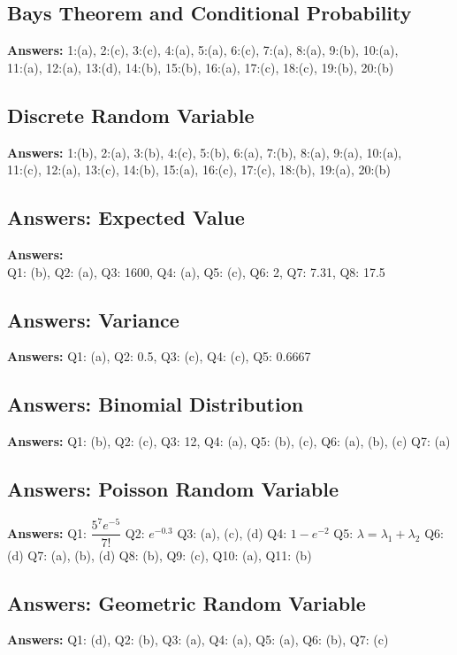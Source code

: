 \subsection*{Bays Theorem and Conditional Probability}
\noindent \textbf{Answers: } 1:(a), 2:(c), 3:(c), 4:(a), 5:(a), 6:(c), 7:(a), 8:(a), 9:(b), 10:(a),\\
11:(a), 12:(a), 13:(d), 14:(b), 15:(b), 16:(a), 17:(c), 18:(c), 19:(b), 20:(b)

\subsection*{Discrete Random Variable}
\noindent \textbf{Answers: } 1:(b), 2:(a), 3:(b), 4:(c), 5:(b), 6:(a), 7:(b), 8:(a), 9:(a), 10:(a),\\
11:(c), 12:(a), 13:(c), 14:(b), 15:(a), 16:(c), 17:(c), 18:(b), 19:(a), 20:(b)

\subsection*{Answers: Expected Value}
\noindent\textbf{Answers:}\\
Q1: (b), Q2: (a), Q3: 1600, Q4: (a), Q5: (c), Q6: 2, Q7: 7.31, Q8: 17.5

\subsection*{Answers: Variance}
\noindent\textbf{Answers:} Q1: (a), Q2: 0.5, Q3: (c), Q4: (c), Q5: 0.6667

\subsection*{Answers: Binomial Distribution}
\noindent\textbf{Answers:} Q1: (b), Q2: (c), Q3: 12, Q4: (a), Q5: (b), (c), Q6: (a), (b), (c) \quad Q7: (a)

\subsection*{Answers: Poisson Random Variable}
\noindent\textbf{Answers:}  
Q1: $\dfrac{5^7 e^{-5}}{7!}$  
Q2: $e^{-0.3}$  
Q3: (a), (c), (d)  
Q4: $1 - e^{-2}$  
Q5: $\lambda = \lambda_1 + \lambda_2$
Q6: (d)  
Q7: (a), (b), (d)
Q8: (b),  
Q9: (c),  
Q10: (a),  
Q11: (b)

\subsection*{Answers: Geometric Random Variable}
\noindent\textbf{Answers:} Q1: (d), Q2: (b), Q3: (a), Q4: (a), Q5: (a), Q6: (b), Q7: (c)

